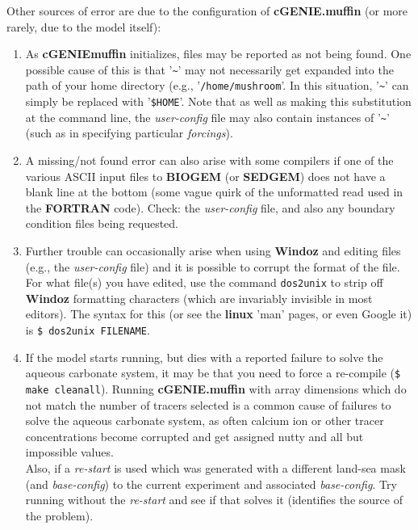 \documentclass[11pt,fleqn]{book} %
\begin{document}
\noindent Other sources of error are due to the configuration of \textbf{cGENIE.muffin} (or more rarely, due to the model itself):
                
\vspace{1mm}
\begin{enumerate}

\vspace{1mm}
\item As \textbf{cGENIEmuffin} initializes, files may be reported as not being found. One possible cause of this is that '\texttt{\~{}}' may not necessarily get expanded into the path of your home directory (e.g., '\texttt{/home/mushroom}'. In this situation, '\texttt{\~{}}' can simply be replaced with '\texttt{\$HOME}'. Note that as well as making this substitution at the command line, the \textit{user-config} file may also contain instances of '\texttt{\~{}}' (such as in specifying particular \textit{forcings}).
        
\vspace{1mm}
\item A missing/not found error can also arise with some compilers if one of the various ASCII input files to \textbf{BIOGEM} (or \textbf{SEDGEM}) does not have a blank line at the bottom (some vague quirk of the unformatted read used in the \textbf{FORTRAN} code). Check: the \textit{user-config} file, and also any boundary condition files being requested.
        
\vspace{1mm}
\item Further trouble can occasionally arise when using \textbf{Windoz} and editing files (e.g., the \textit{user-config} file) and it is possible to corrupt the format of the file. For what file(s) you have edited, use the command \texttt{dos2unix} to strip off \textbf{Windoz} formatting characters (which are invariably invisible in most editors). The syntax for this (or see the \textbf{linux} 'man' pages, or even Google it) is \texttt{\$ dos2unix FILENAME}.
        
\vspace{1mm}
\item If the model starts running, but dies with a reported failure to solve the aqueous carbonate system, it may be that you need to force a re-compile (\texttt{\$ make cleanall}). Running \textbf{cGENIE.muffin} with array dimensions which do not match the number of tracers selected is a common cause of failures to solve the aqueous carbonate system, as often calcium ion or other tracer concentrations become corrupted and get assigned nutty and all but impossible values.
\\Also, if a \textit{re-start} is used which was generated with a different land-sea mask (and \textit{base-config}) to the current experiment and associated \textit{base-config}. Try running without the \textit{re-start} and see if that solves it (identifies the source of the problem).

\end{enumerate}
\vspace{2mm}
\end{document}
